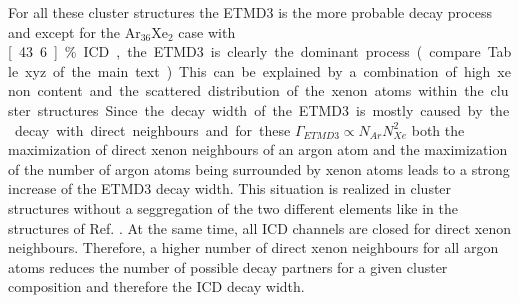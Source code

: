 For all these cluster structures the ETMD3 is the more probable decay process and
except for the Ar$_{36}$Xe$_2$ case with \unit[43.6]{\%} ICD, the ETMD3 is clearly
the dominant process (compare Table xyz of the main text).
This can be explained by a combination of high xenon content and the
scattered distribution of the xenon atoms within the cluster structures.
Since the decay width of the ETMD3 is mostly caused by the decay
with direct neighbours and for these $\Gamma_{ETMD3} \propto N_{Ar} N_{Xe}^2$
both the maximization of direct xenon neighbours of an argon atom and the
maximization of the number of argon atoms being surrounded by xenon atoms
leads to a strong increase of the ETMD3 decay width. This situation is realized
in cluster structures without a seggregation of the two different elements like
in the structures of Ref. \cite{}. At the same time, all ICD channels are closed
for direct xenon neighbours. Therefore, a higher number of direct xenon neighbours
for all argon atoms reduces the number of possible decay partners for a given
cluster composition and therefore the ICD decay width.



%
